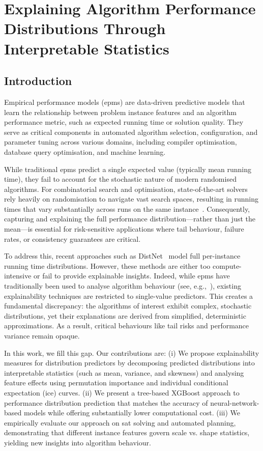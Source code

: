 \chapter{Explaining Algorithm Performance Distributions Through Interpretable Statistics}
\label{sec:dist_explain}

\section{Introduction}
\label{sec:intro}

Empirical performance models (\glspl{epm}) are data-driven predictive models that learn the relationship between problem instance features and an algorithm performance metric, such as expected running time or solution quality. They serve as critical components in automated algorithm selection, configuration, and parameter tuning across various domains, including compiler optimisation, database query optimisation, and machine learning.

While traditional \glspl{epm} predict a single expected value (typically mean running time), they fail to account for the stochastic nature of modern randomised algorithms. For combinatorial search and optimisation, state-of-the-art solvers rely heavily on randomisation to navigate vast search spaces, resulting in running times that vary substantially across runs on the same instance~\citep{HooStt04}. Consequently, capturing and explaining the full performance distribution—rather than just the mean—is essential for risk-sensitive applications where tail behaviour, failure rates, or consistency guarantees are critical.

To address this, recent approaches such as DistNet~\citep{EggEtAl18} model full per-instance running time distributions. However, these methods are either too compute-intensive or fail to provide explainable insights. Indeed, while \glspl{epm} have traditionally been used to analyse algorithm behaviour (see, e.g.,~\citealp{HutEtAl13}), existing explainability techniques are restricted to single-value predictors. This creates a fundamental discrepancy: the algorithms of interest exhibit complex, stochastic distributions, yet their explanations are derived from simplified, deterministic approximations. As a result, critical behaviours like tail risks and performance variance remain opaque.

In this work, we fill this gap. Our contributions are:
(i) We propose explainability measures for distribution predictors by decomposing predicted distributions into interpretable statistics (such as mean, variance, and skewness) and analysing feature effects using permutation importance and individual conditional expectation (\gls{ice}) curves.
(ii) We present a tree-based XGBoost approach to performance distribution prediction that matches the accuracy of neural-network-based models while offering substantially lower computational cost.
(iii) We empirically evaluate our approach on \gls{sat} solving and automated planning, demonstrating that different instance features govern scale vs. shape statistics, yielding new insights into algorithm behaviour.

